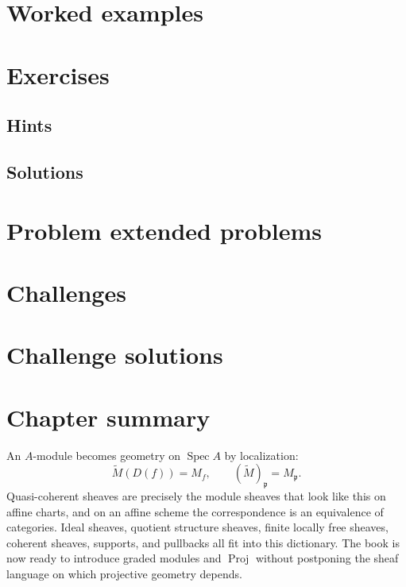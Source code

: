 \section{Worked examples}


\section{Exercises}


\ifdefined\IncludeExerciseHints
\subsection*{Hints}

\fi

\ifdefined\IncludeExerciseSolutions
\subsection*{Solutions}

\fi

\section{Problem extended problems}


\section{Challenges}


\ifdefined\IncludeChallengeSolutions
\section{Challenge solutions}

\fi

\section{Chapter summary}
An $A$-module becomes geometry on $\operatorname{Spec}A$ by localization:
\[
\widetilde M(D(f))=M_f,
\qquad
(\widetilde M)_{\mathfrak p}=M_{\mathfrak p}.
\]
Quasi-coherent sheaves are precisely the module sheaves that look like this on affine charts, and on an affine scheme the correspondence is an equivalence of categories.  Ideal sheaves, quotient structure sheaves, finite locally free sheaves, coherent sheaves, supports, and pullbacks all fit into this dictionary.  The book is now ready to introduce graded modules and $\operatorname{Proj}$ without postponing the sheaf language on which projective geometry depends.
